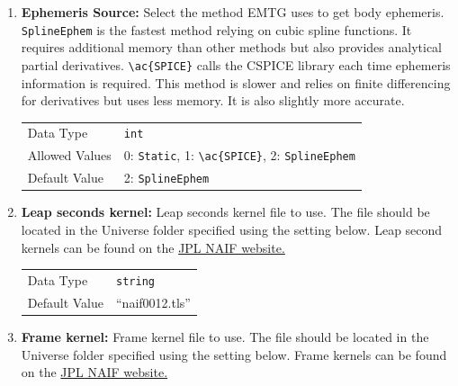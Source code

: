     \begin{enumerate}

        \item \textbf{Ephemeris Source:} Select the method \ac{EMTG} uses to get body ephemeris. \verb|SplineEphem| is the fastest method relying on cubic spline functions. It requires additional memory than other methods but also provides analytical partial derivatives. \verb|\ac{SPICE}| calls the CSPICE library each time ephemeris information is required. This method is slower and relies on finite differencing for derivatives but uses less memory. It is also slightly more accurate.

            \begin{table}[H]
                \hspace{2cm}
                \begin{tabular}{ll}
                Data Type & \verb|int| \\
                Allowed Values & 0: \verb|Static|, 1: \verb|\ac{SPICE}|, 2: \verb|SplineEphem| \\
                Default Value & 2: \verb|SplineEphem| \\
                \end{tabular}
            \end{table}

        \item \textbf{Leap seconds kernel:} Leap seconds kernel file to use. The file should be located in the Universe folder specified using the setting below. Leap second kernels can be found on the \href{https://naif.jpl.nasa.gov/naif/data_generic.html}{JPL NAIF website.}

            \begin{table}[H]
                \hspace{2cm}
                \begin{tabular}{ll}
                Data Type & \verb|string| \\
                Default Value & ``naif0012.tls'' \\
                \end{tabular}
            \end{table}

        \item \textbf{Frame kernel:} Frame kernel file to use. The file should be located in the Universe folder specified using the setting below. Frame kernels can be found on the \href{https://naif.jpl.nasa.gov/naif/data_generic.html}{JPL NAIF website.}


\end{enumerate}
